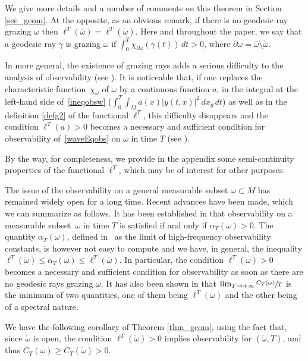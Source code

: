 \documentclass[JEP,XML,SOM,Unicode, NoEqCountersInSection,NoFloatCountersInSection,published]{cedram}
\theoremstyle{definition}
\begin{document}
We give more details and a number of comments on this theorem in Section \ref{sec_geom}. At the opposite, as an obvious remark, if there is no geodesic ray {grazing} $\omega$ then $\ell^T(\overline\omega)=\ell^T(\mathring{\omega})$. {Here and throughout the paper, we say that a geodesic ray $\gamma$ is grazing $\omega$ if $\int_0^T\chi_{\partial\omega}(\gamma(t))\, dt>0$, where $\partial\omega=\overline\omega\setminus\mathring{\omega}$.}

In more general, the existence of grazing rays adds a serious difficulty to the analysis of observability (see \cite{BardosLebeauRauch}). It is noticeable that, if one replaces the characteristic function~$\chi_\omega$ of $\omega$ by a continuous function $a$, in the integral at the left-hand side of~\eqref{ineqobsw} (\ie $\int_0^T\int_M a(x)\vert y(t,x)\vert^2\, dx_g\, dt$) as well as in the definition \eqref{defg2} of the functional $\ell^T$, this difficulty disappears and the condition $\ell^T(a)>0$ becomes a necessary and sufficient condition for observability of~\eqref{waveEqobs} on $\omega$ in time $T$ (see \cite{BurqGerard1997}).

By the way, for completeness, we provide in the appendix some semi-continuity properties of the functional $\ell^T$, which may be of interest for other purposes.

The issue of the observability on a general measurable subset $\omega\subset M$ has remained widely open for a long time. Recent advances have been made, which we can summarize as follows. It has been established in \cite{hpt} that observability on a measurable subset~$\omega$ in time $T$ is satisfied if and only if $\alpha_T(\omega)>0$. The quantity $\alpha_T(\omega)$, defined in~\cite{hpt} as the limit of high-frequency observability constants, is however not easy to compute and we have, in general, the inequality $\ell^T(\mathring{\omega}) \leq \alpha_T(\omega) \leq \ell^T(\overline\omega)$. In particular, the condition $\ell^T(\omega)>0$ becomes a necessary and sufficient condition for observability as soon as there are no geodesic rays grazing $\omega$.
It has also been shown in \cite{hpt} that $\lim_{T \to+ \infty}\sfrac{C_T(\omega)}{T}$ is the minimum of two quantities, one of them being $\ell^T(\overline\omega)$ and the other being of a spectral nature.

We have the following corollary of Theorem \ref{thm_geom}, using the fact that, since $\mathring{\omega}$ is open, the condition $\ell^T(\mathring{\omega})>0$ implies observability for $(\mathring{\omega},T)$, and thus $C_T(\omega)\geq C_T(\mathring{\omega})>0$.
\end{document}
